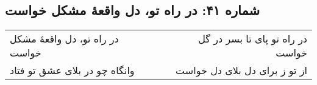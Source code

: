 \begin{center}
\section*{شماره ۴۱: در راه تو، دل واقعۀ مشکل خواست}
\label{sec:041}
\begin{longtable}{l p{0.5cm} r}
در راه تو، دل واقعهٔ مشکل خواست
&&
در راه تو پای تا بسر در گل خواست
\\
وانگاه چو در بلای عشق تو فتاد
&&
از تو ز برای دل بلای دل خواست
\\
\end{longtable}
\end{center}
